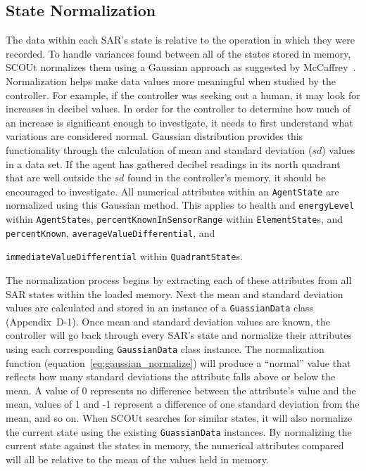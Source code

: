 \subsection{State Normalization}
The data within each SAR's state is relative to the operation in which they were recorded.
To handle variances found between all of the states stored in memory, SCOUt normalizes them using a Gaussian approach as suggested by McCaffrey~\cite{mccaffrey_how_nodate}.
Normalization helps make data values more meaningful when studied by the controller.
For example, if the controller was seeking out a human, it may look for increases in decibel values.
In order for the controller to determine how much of an increase is significant enough to investigate, it needs to first understand what variations are considered normal.
Gaussian distribution provides this functionality through the calculation of mean and standard deviation ($sd$) values in a data set.
If the agent has gathered decibel readings in its north quadrant that are well outside the $sd$ found in the controller's memory, it should be encouraged to investigate.
All numerical attributes within an \texttt{AgentState} are normalized using this Gaussian method.
This applies to health and \texttt{energyLevel} within \texttt{AgentState}s, \texttt{percentKnownInSensorRange} within \texttt{ElementState}s, and \texttt{percentKnown}, \texttt{averageValueDifferential}, and

\noindent
\texttt{immediateValueDifferential} within \texttt{QuadrantState}s.

The normalization process begins by extracting each of these attributes from all SAR states within the loaded memory.
Next the mean and standard deviation values are calculated and stored in an instance of a \texttt{GuassianData} class (Appendix~D-1).
Once mean and standard deviation values are known, the controller will go back through every SAR's state and normalize their attributes using each corresponding \texttt{GaussianData} class instance.
The normalization function (equation~\ref{eq:gaussian_normalize}) will produce a ``normal'' value that reflects how many standard deviations the attribute falls above or below the mean.
A value of 0 represents no difference between the attribute's value and the mean, values of 1 and -1 represent a difference of one standard deviation from the mean, and so on.
When SCOUt searches for similar states, it will also normalize the current state using the existing \texttt{GuassianData} instances.
By normalizing the current state against the states in memory, the numerical attributes compared will all be relative to the mean of the values held in memory.

